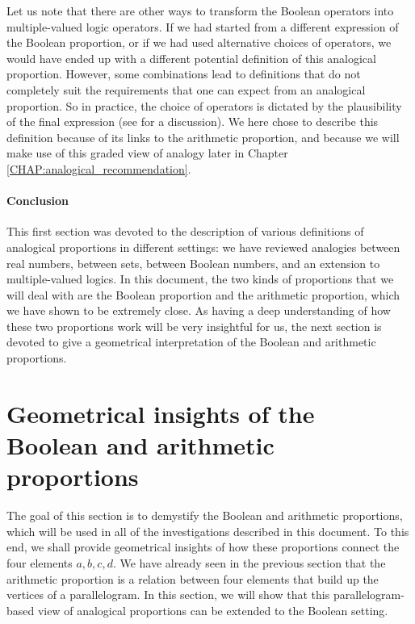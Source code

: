Let us note that there are other ways to transform the Boolean operators into
multiple-valued logic operators. If we had started from a different expression
of the Boolean proportion, or if we had used alternative choices of operators,
we would have ended up with a different potential definition of this analogical
proportion. However, some combinations lead to definitions that do not
completely suit the requirements that one can expect from an analogical
proportion. So in practice, the choice of operators is dictated by the
plausibility of the final expression (see \cite{PraRic13} for a discussion).
We here chose to describe this definition because of its links to the
arithmetic proportion, and because  we will make use of this graded view of
analogy later in Chapter \ref{CHAP:analogical_recommendation}.

\paragraph{Conclusion\\}
This first section was devoted to the description of various definitions of
analogical proportions in different settings: we have reviewed analogies between
real numbers, between sets, between Boolean numbers, and an extension to
multiple-valued logics. In this document, the two kinds of proportions that we
will deal with are the Boolean proportion and the arithmetic proportion, which
we have shown to be extremely close. As having a deep understanding of how
these two proportions work will be very insightful for us, the next section is
devoted to give a geometrical interpretation of the Boolean and arithmetic
proportions.

\section{Geometrical insights of the Boolean and arithmetic proportions}

The goal of this section is to demystify the Boolean and arithmetic
proportions, which will be used in all of the investigations described in this
document. To this end, we shall provide geometrical insights of how these
proportions connect the four elements $a, b, c, d$.  We have already seen in the
previous section that the arithmetic proportion is a relation between four
elements that build up the vertices of a parallelogram.  In this section, we
will show that this parallelogram-based view of analogical proportions can be
extended to the Boolean setting.


